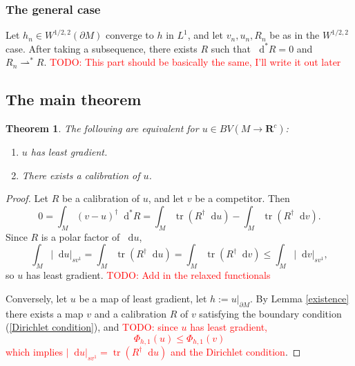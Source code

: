 \documentclass[reqno,11pt]{amsart}
\newcommand{\RR}{\mathbf{R}}
\newcommand*\dif{\mathop{}\!\mathrm{d}}
\DeclareMathOperator{\tr}{tr}
\newtheorem{theorem}{Theorem}[section]
\theoremstyle{definition}
\numberwithin{equation}{section}
\newcommand\todo[1]{\textcolor{red}{TODO: #1}}
\begin{document}
\subsubsection{The general case}
Let $h_n \in W^{1/2, 2}(\partial M)$ converge to $h$ in $L^1$, and let $v_n, u_n, R_n$ be as in the $W^{1/2, 2}$ case.
After taking a subsequence, there exists $R$ such that $\dif^* R = 0$ and $R_n \rightharpoonup^* R$.
\todo{This part should be basically the same, I'll write it out later}

\subsection{The main theorem}
\begin{theorem}
The following are equivalent for $u \in BV(M \to \RR^c)$:
\begin{enumerate}
\item $u$ has least gradient.
\item There exists a calibration of $u$.
\end{enumerate}
\end{theorem}
\begin{proof}
Let $R$ be a calibration of $u$, and let $v$ be a competitor. Then
$$0 = \int_M (v - u)^\dagger \dif^* R = \int_M \tr(R^\dagger \dif u) - \int_M \tr(R^\dagger \dif v).$$
Since $R$ is a polar factor of $\dif u$,
$$\int_M |\dif u|_{sv^1} = \int_M \tr(R^\dagger \dif u) = \int_M \tr(R^\dagger \dif v) \leq \int_M |\dif v|_{sv^1},$$
so $u$ has least gradient. \todo{Add in the relaxed functionals}

Conversely, let $u$ be a map of least gradient, let $h := u|_{\partial M}$.
By Lemma \ref{existence} there exists a map $v$ and a calibration $R$ of $v$ satisfying the boundary condition (\ref{Dirichlet condition}), and \todo{since $u$ has least gradient,
$$\Phi_{h, 1}(u) \leq \Phi_{h, 1}(v)$$
which implies $|\dif u|_{sv^1} = \tr(R^\dagger \dif u)$ and the Dirichlet condition}.
\end{proof}
\end{document}

